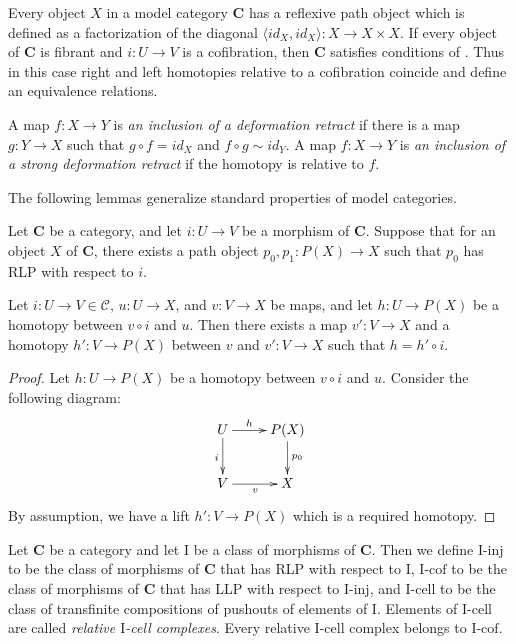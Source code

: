 \documentclass{amsart}
\theoremstyle{definition}
\newcommand{\cof}{\mathcal{C}}
\newcommand{\cat}[1]{\mathbf{#1}}
\newcommand{\C}{\cat{C}}
\newcommand{\I}{\mathrm{I}}
\newcommand{\class}[2]{#1\text{-}\mathrm{#2}}
\newcommand{\Iinj}[1][\I]{\class{#1}{inj}}
\newcommand{\Icell}[1][\I]{\class{#1}{cell}}
\newcommand{\Icof}[1][\I]{\class{#1}{cof}}
\begin{document}
\begin{rem}
Every object $X$ in a model category $\C$ has a reflexive path object which is defined as a factorization of the diagonal $\langle id_X, id_X \rangle : X \to X \times X$.
If every object of $\C$ is fibrant and $i : U \to V$ is a cofibration, then $\C$ satisfies conditions of .
Thus in this case right and left homotopies relative to a cofibration coincide and define an equivalence relations.
\end{rem}

A map $f : X \to Y$ is \emph{an inclusion of a deformation retract} if there is
a map $g : Y \to X$ such that $g \circ f = id_X$ and $f \circ g \sim id_Y$.
A map $f : X \to Y$ is \emph{an inclusion of a strong deformation retract} if the homotopy is relative to $f$.

The following lemmas generalize standard properties of model categories.

\begin{lem}
Let $\C$ be a category, and let $i : U \to V$ be a morphism of $\C$.
Suppose that for an object $X$ of $\C$, there exists a path object $p_0,p_1 : P(X) \to X$ such that $p_0$ has RLP with respect to $i$.

Let $i : U \to V \in \cof$, $u : U \to X$, and $v : V \to X$ be maps, and let $h : U \to P(X)$ be a homotopy between $v \circ i$ and $u$.
Then there exists a map $v' : V \to X$ and a homotopy $h' : V \to P(X)$ between $v$ and $v' : V \to X$ such that $h = h' \circ i$.
\end{lem}
\begin{proof}
Let $h : U \to P(X)$ be a homotopy between $v \circ i$ and $u$.
Consider the following diagram:
\[ \xymatrix{ U \ar[r]^-h \ar[d]_i & P(X) \ar[d]^{p_0} \\
              V \ar[r]_v & X
            } \]
By assumption, we have a lift $h' : V \to P(X)$ which is a required homotopy.
\end{proof}

Let $\C$ be a category and let $\I$ be a class of morphisms of $\C$.
Then we define $\Iinj$ to be the class of morphisms of $\C$ that has RLP with respect to $\I$,
$\Icof$ to be the class of morphisms of $\C$ that has LLP with respect to $\Iinj$, and
$\Icell$ to be the class of transfinite compositions of pushouts of elements of $\I$.
Elements of $\Icell$ are called \emph{relative $\I$-cell complexes}.
Every relative $\I$-cell complex belongs to $\Icof$.
\end{document}
